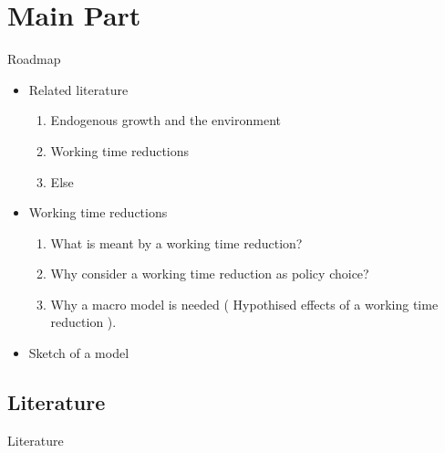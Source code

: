 \documentclass[11pt,aspectratio=169]{beamer}
\begin{document}
\section{Main Part}
\begin{frame}{Roadmap}
\begin{itemize}
\item Related literature %
\begin{enumerate}
\item Endogenous growth and the environment
\item Working time reductions
\item Else %
\end{enumerate}
\item Working time reductions %
\begin{enumerate}
	\item What is meant by a working time reduction? 
\item Why consider a working time reduction as policy choice? %
\item Why a macro model is needed ( Hypothised effects of a working time reduction ).
\end{enumerate}
\item Sketch of a model %
\end{itemize}
\end{frame}


\subsection{Literature}
\begingroup
{}
\begin{frame}
	\huge{Literature}
\end{frame}
\endgroup
\end{document}
